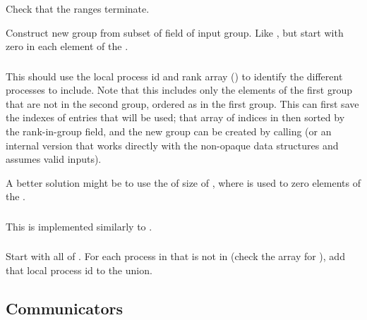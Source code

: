\documentclass{article}
\begin{document}
\subsubsection{}
  Check that the ranges terminate.
\begin{adi3}
  Construct new group from subset of  field of
  input group.  Like , but start with zero in
  each element of the .
\end{adi3}

\subsubsection{}

This should use the local process id and rank array
() to identify the different
processes to include.  Note that this includes only the elements of the first
group that are not in the second group, ordered as in the first group.  
This can first save the indexes of entries that will be used; that array of
indices in then sorted by the rank-in-group field, and the new group can be
created by calling  (or an internal version that works
directly with the non-opaque data structures and assumes valid inputs).

A better solution might be to use the  of size of
, where  is used to zero elements of the
.  

\subsubsection{}

This is implemented similarly to .

\subsubsection{}

Start with all of .  For each process in  that is
not in  (check the  array for
), add that local process id to the union.

\subsection{Communicators}
\label{sec:communicators}
\end{document}
